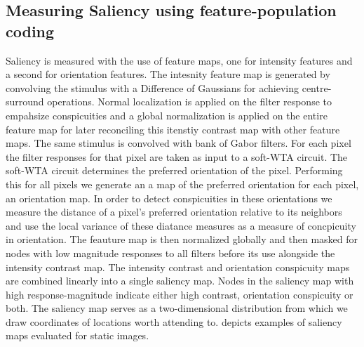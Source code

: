 \documentclass{report}
\begin{document}
\subsection{Measuring Saliency using feature-population coding}

Saliency is measured with the use of feature maps, one for intensity features and a second for orientation features. The intesnity feature map is generated by convolving the stimulus with a Difference of Gaussians for achieving centre-surround operations. Normal localization is applied on the filter response to empahsize conspicuities and a global normalization is applied on the entire feature map for later reconciling this itenstiy contrast map with other feature maps.  
The same stimulus is convolved with bank of Gabor filters. For each pixel the filter responses for that pixel are taken as input to a soft-WTA circuit. The soft-WTA circuit determines the preferred orientation of the pixel. Performing this for all pixels we generate an a map of the preferred orientation for each pixel, an orientation map. In order to detect conspicuities in these orientations we measure the distance of a pixel's preferred orientation relative to its neighbors and use the local variance of these diatance measures as a measure of concpicuity in orientation. The feauture map is then normalized globally and then masked for nodes with low magnitude responses to all filters before its use alongside the intensity contrast map.
The intensity contrast and orientation conspicuity maps are combined linearly into a single saliency map. Nodes in the saliency map with high response-magnitude indicate either high contrast, orientation conspicuity or both. The saliency map serves as a two-dimensional distribution from which we draw coordinates of locations worth attending to.  depicts examples of saliency maps evaluated for static images.
\end{document}
